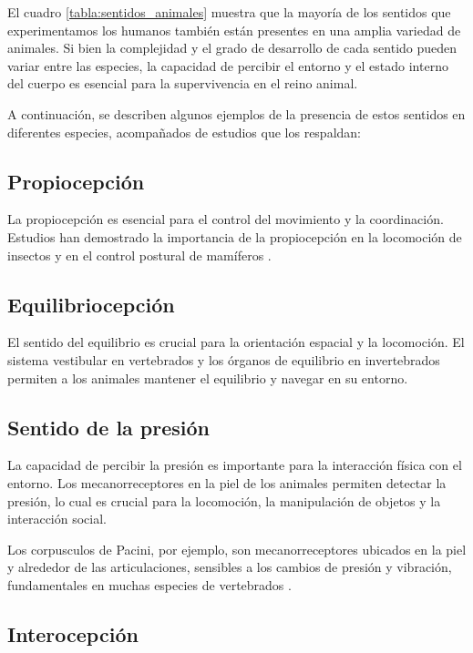 \documentclass[conference]{IEEEtran}
\begin{document}
El cuadro \ref{tabla:sentidos_animales} muestra que la mayoría de los sentidos que experimentamos los humanos también están presentes en una amplia variedad de animales.  Si bien la complejidad y el grado de desarrollo de cada sentido pueden variar entre las especies,  la capacidad de percibir el entorno y el estado interno del cuerpo es esencial para la supervivencia en el reino animal.

A continuación, se describen algunos ejemplos de la presencia de estos sentidos en diferentes especies, acompañados de estudios que los respaldan:\\

\subsection{Propiocepción}

La propiocepción es esencial para el control del movimiento y la coordinación. Estudios han demostrado la importancia de la propiocepción en la locomoción de insectos \cite{bässler1983neural} y en el control postural de mamíferos \cite{jahn2020postural}.

\subsection{Equilibriocepción}

El sentido del equilibrio es crucial para la orientación espacial y la locomoción. El sistema vestibular en vertebrados \cite{wilson1979vestibular} y los órganos de equilibrio en invertebrados \cite{fraser1981semicircular} permiten a los animales mantener el equilibrio y navegar en su entorno.

\subsection{Sentido de la presión}

La capacidad de percibir la presión es importante para la interacción física con el entorno. Los mecanorreceptores en la piel de los animales permiten detectar la presión, lo cual es crucial para la locomoción, la manipulación de objetos y la interacción social. 

Los corpusculos de Pacini, por ejemplo, son mecanorreceptores ubicados en la piel y alrededor de las articulaciones, sensibles a los cambios de presión y vibración, fundamentales en muchas especies de vertebrados \cite{springer2021mechanoreceptors}.

\subsection{Interocepción}
\end{document}

